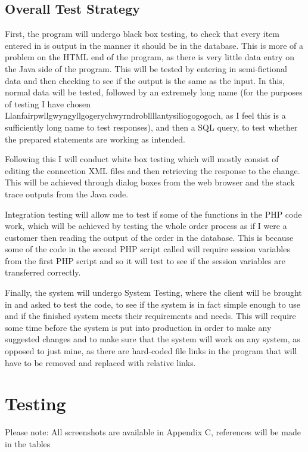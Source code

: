 \documentclass[
11pt, %
a4paper, %
oneside, %
headinclude,footinclude, %
BCOR5mm, %
]{scrartcl}
\begin{document}
\subsection{Overall Test Strategy}
First, the program will undergo black box testing, to check that every item entered in is output in the manner it should be in the database. This is more of a problem on the HTML end of the program, as there is very little data entry on the Java side of the program. This will be tested by entering in semi-fictional data and then checking to see if the output is the same as  the input. In this, normal data will be tested, followed by an extremely long name (for the purposes of testing I have chosen Llanfairpwllgwyngyllgogerychwyrndrobllllantysiliogogogoch, as I feel this is a sufficiently long name to test responses), and then a SQL query, to test whether the prepared statements are working as intended. \par Following this I will conduct white box testing which will mostly consist of editing the connection XML files and then retrieving the response to the change. This will be achieved through dialog boxes from the web browser and the stack trace outputs from the Java code. \par Integration testing will allow me to test if some of the functions in the PHP code work, which will be achieved by testing the whole order process as if I were a customer then reading the output of the order in the database. This is because some of the code in the second PHP script called will require session variables from the first PHP script and so it will test to see if the session variables are transferred correctly. \par Finally, the system will undergo System Testing, where the client will be brought in and asked to test the code, to see if the system is in fact simple enough to use and if the finished system meets their requirements and needs. This will require some time before the system is put into production in order to make any suggested changes and to make sure that the system will work on any system, as opposed to just mine, as  there are hard-coded file links in the program that will have to be removed and replaced with relative links. 

\section{Testing}
Please note: All screenshots are available in Appendix C, references will be made in the tables
\end{document}

